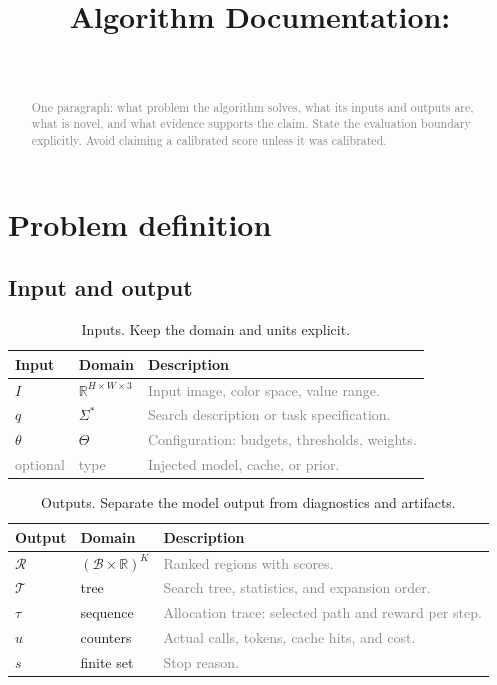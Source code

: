 \documentclass[11pt]{article}
\title{\textbf{\ProjectName}\\[2pt]
\large Algorithm Documentation: \AlgorithmName}
\author{\ph{Author Name}\\\ph{Affiliation}}
\date{\ph{Date or version}}
\newcommand{\ph}[1]{\textcolor{gray}{#1}}   %
\newcommand{\R}{\mathbb{R}}
\newcommand{\set}[1]{\mathcal{#1}}
\begin{document}
\maketitle

\begin{abstract}
\ph{One paragraph: what problem the algorithm solves, what its inputs and outputs
are, what is novel, and what evidence supports the claim. State the evaluation
boundary explicitly. Avoid claiming a calibrated score unless it was calibrated.}
\end{abstract}

\tableofcontents

\section{Problem definition}

\subsection{Input and output}

\begin{table}[h]
\centering
\small
\begin{tabularx}{\textwidth}{@{}l l X@{}}
\toprule
\textbf{Input} & \textbf{Domain} & \textbf{Description} \\
\midrule
$I$ & $\R^{H \times W \times 3}$ & \ph{Input image, color space, value range.} \\
$q$ & $\Sigma^\ast$ & \ph{Search description or task specification.} \\
$\theta$ & $\Theta$ & \ph{Configuration: budgets, thresholds, weights.} \\
\ph{optional} & \ph{type} & \ph{Injected model, cache, or prior.} \\
\bottomrule
\end{tabularx}
\caption{Inputs. Keep the domain and units explicit.}
\label{tab:inputs}
\end{table}

\begin{table}[h]
\centering
\small
\begin{tabularx}{\textwidth}{@{}l l X@{}}
\toprule
\textbf{Output} & \textbf{Domain} & \textbf{Description} \\
\midrule
$\set{R}$ & $(\set{B} \times \R)^{K}$ & \ph{Ranked regions with scores.} \\
$\set{T}$ & tree & \ph{Search tree, statistics, and expansion order.} \\
$\tau$ & sequence & \ph{Allocation trace: selected path and reward per step.} \\
$u$ & counters & \ph{Actual calls, tokens, cache hits, and cost.} \\
$s$ & finite set & \ph{Stop reason.} \\
\bottomrule
\end{tabularx}
\caption{Outputs. Separate the model output from diagnostics and artifacts.}
\label{tab:outputs}
\end{table}
\end{document}
